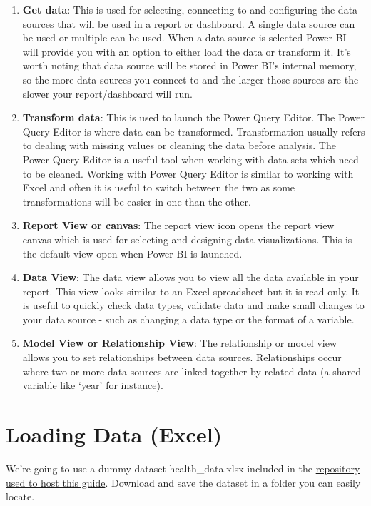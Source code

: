 \documentclass[
]{book}
\begin{document}
\begin{enumerate}
\def\labelenumi{\arabic{enumi}.}
\item
  \textbf{Get data}: This is used for selecting, connecting to and configuring the data sources that will be used in a report or dashboard. A single data source can be used or multiple can be used. When a data source is selected Power BI will provide you with an option to either load the data or transform it. It's worth noting that data source will be stored in Power BI's internal memory, so the more data sources you connect to and the larger those sources are the slower your report/dashboard will run.
\item
  \textbf{Transform data}: This is used to launch the Power Query Editor. The Power Query Editor is where data can be transformed. Transformation usually refers to dealing with missing values or cleaning the data before analysis. The Power Query Editor is a useful tool when working with data sets which need to be cleaned. Working with Power Query Editor is similar to working with Excel and often it is useful to switch between the two as some transformations will be easier in one than the other.
\item
  \textbf{Report View or canvas}: The report view icon opens the report view canvas which is used for selecting and designing data visualizations. This is the default view open when Power BI is launched.
\item
  \textbf{Data View}: The data view allows you to view all the data available in your report. This view looks similar to an Excel spreadsheet but it is read only. It is useful to quickly check data types, validate data and make small changes to your data source - such as changing a data type or the format of a variable.
\item
  \textbf{Model View or Relationship View}: The relationship or model view allows you to set relationships between data sources. Relationships occur where two or more data sources are linked together by related data (a shared variable like `year' for instance).
\end{enumerate}

\hypertarget{loading-data-excel}{%
\section{Loading Data (Excel)}\label{loading-data-excel}}

We're going to use a dummy dataset health\_data.xlsx included in the \href{https://github.com/aamcmurray/BookTest/blob/main/health_data.xlsx}{repository used to host this guide}. Download and save the dataset in a folder you can easily locate.
\end{document}
